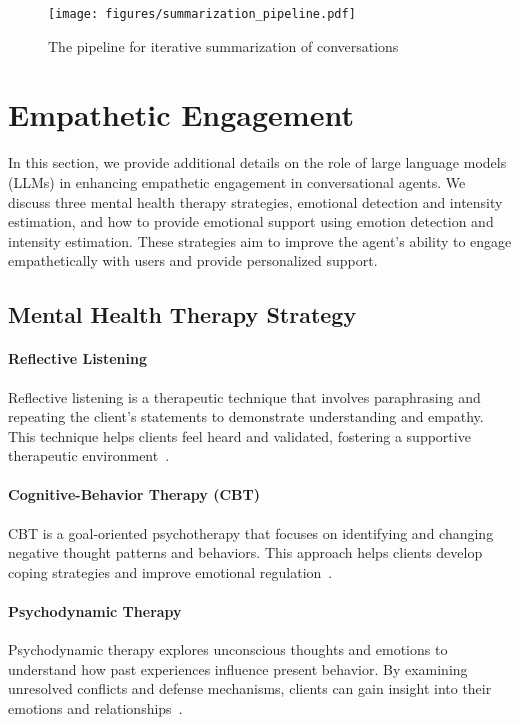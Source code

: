 \begin{figure}
    \centering
    \texttt{[image: figures/summarization\_pipeline.pdf]}
    \caption{The pipeline for iterative summarization of conversations}
    \label{fig:summary_pipe}
\end{figure}


\section{Empathetic Engagement}\label{appendix:engagement}
In this section, we provide additional details on the role of large language models (LLMs) in enhancing empathetic engagement in conversational agents. We discuss three mental health therapy strategies, emotional detection and intensity estimation, and how to provide emotional support using emotion detection and intensity estimation. These strategies aim to improve the agent's ability to engage empathetically with users and provide personalized support.
\subsection{Mental Health Therapy Strategy}\label{appendix:therapy_strategy}
\paragraph{Reflective Listening} Reflective listening is a therapeutic technique that involves paraphrasing and repeating the client's statements to demonstrate understanding and empathy. This technique helps clients feel heard and validated, fostering a supportive therapeutic environment~\cite{rautalinko2007reflective}.
\paragraph{Cognitive-Behavior Therapy (CBT)} CBT is a goal-oriented psychotherapy that focuses on identifying and changing negative thought patterns and behaviors. This approach helps clients develop coping strategies and improve emotional regulation~\cite{beck2020cognitive}.
\paragraph{Psychodynamic Therapy} Psychodynamic therapy explores unconscious thoughts and emotions to understand how past experiences influence present behavior. By examining unresolved conflicts and defense mechanisms, clients can gain insight into their emotions and relationships~\cite{leichsenring2003effectiveness}.

